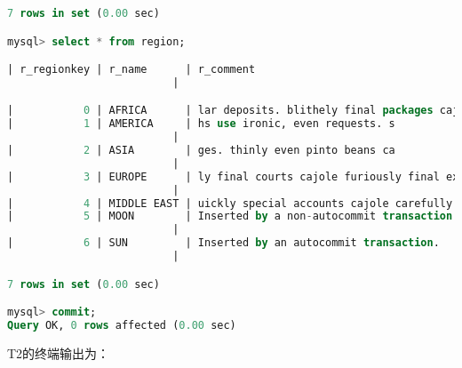 \documentclass{article}
\begin{document}
\begin{lstlisting}[language=sql]
7 rows in set (0.00 sec)

mysql> select * from region;

| r_regionkey | r_name      | r_comment
                          |

|           0 | AFRICA      | lar deposits. blithely final packages cajole. regular waters are final requests. regular accounts are according to  |
|           1 | AMERICA     | hs use ironic, even requests. s
                          |
|           2 | ASIA        | ges. thinly even pinto beans ca
                          |
|           3 | EUROPE      | ly final courts cajole furiously final excuse
                          |
|           4 | MIDDLE EAST | uickly special accounts cajole carefully blithely close requests. carefully final asymptotes haggle furiousl        |
|           5 | MOON        | Inserted by a non-autocommit transaction.
                          |
|           6 | SUN         | Inserted by an autocommit transaction.
                          |

7 rows in set (0.00 sec)

mysql> commit;
Query OK, 0 rows affected (0.00 sec)

\end{lstlisting}

T2的终端输出为：
\end{document}
